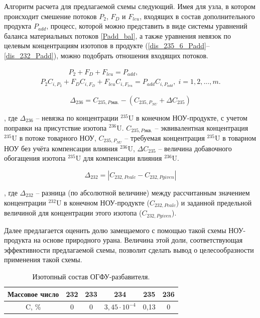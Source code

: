 Алгоритм расчета для предлагаемой схемы следующий. Имея для узла, в котором происходит смешение потоков $P_2$, $F_D$ и $F_{leu}$, входящих в состав дополнительного продукта $P_{add}$, процесс, которой можно представить в виде системы уравнений баланса материальных потоков \ref{Padd_bal}, а также уравнения невязок по целевым концентрациям изотопов в продукте (\ref{dis_235_6_Padd}--\ref{dis_232_Padd}), можно подобрать отношения входящих потоков.

\begin{equation} \label{Padd_bal} 
  \begin{array}{l} {\quad \quad \quad \quad {P_{2}+F_D+F_{leu}=P_{add}},} \\ {P_{2}C_{i,P_{2}} + F_DC_{i,F_D} + F_{leu}C_{i,F_{leu}}  = P_{add}C_{i,P_{add}} ,\; i=1,2,...,m.} \end{array} 
\end{equation}


\begin{equation}
    \label{dis_235_6_Padd}
    \Delta_{236}=C_{235,P\textit{экв.}}-(C_{235,{P_{NU}}}+\Delta C_{235})
\end{equation}

, где $\Delta_{236}$ -- невязка по концентрации $^{235}$U в конечном НОУ-продукте, с учетом поправки на присутствие изотопа $^{236}$U. $C_{235,P\textit{экв.}}$ -- эквивалентная концентрация $^{235}$U в потоке товарного НОУ, $C_{235,{P_{NU}}}$ -- требуемая концентрация $^{235}$U в товарном НОУ без учёта компенсации влияния $^{236}$U, $\Delta C_{235}$ -- величина добавочного обогащения изотопа $^{235}$U для компенсации влияния $^{236}$U. 

\begin{equation}
\label{dis_232_Padd}
\Delta_{232}=\left|C_{232,P\textit{calc}}-C_{232,P\textit{given}}\right|
\end{equation}

, где $\Delta_{232}$ -- разница (по абсолютной величине) между рассчитанным значением концентрации $^{232}$U в конечном НОУ-продукте ($C_{232,P\textit{calc}}$) и заданной предельной величиной для концентрации этого изотопа ($C_{232,P\textit{given}}$).



Далее предлагается оценить долю замещаемого с помощью такой схемы НОУ-продукта на основе природного урана. Величина этой доли, соответствующая эффективности предлагаемой схемы, позволит сделать вывод о целесообразности применения такой схемы.  

\begin{table}[h]
    \centering
    \normalsize
    \begin{tabulary}{1.0\textwidth}{|c|c|c|c|c|c|}
        \hline Массовое число & 232 & 233 & 234 & 235 & 236\\
        \hline C, \% & 0 & 0 & $3,45\cdot10^{-4}$ & 0,13 & 0 \\\hline
    \end{tabulary}
\caption{{Изотопный состав ОГФУ-разбавителя.{\label{DepU13}}}}
\end{table}

